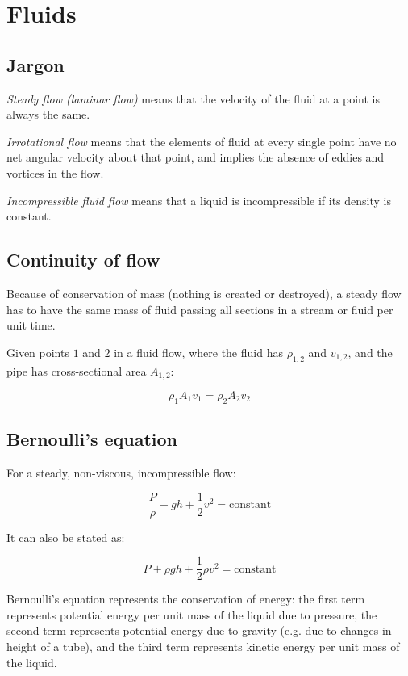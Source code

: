 \documentclass[12pt]{article}
\begin{document}
\newpage

\section{Fluids}

\subsection{Jargon}

\emph{Steady flow (laminar flow)} means that the velocity of the fluid at a point is always the same.

\emph{Irrotational flow} means that the elements of fluid at every single point have no net angular velocity about that point, and implies the absence of eddies and vortices in the flow.

\emph{Incompressible fluid flow} means that a liquid is incompressible if its density is constant.

\subsection{Continuity of flow}

Because of conservation of mass (nothing is created or destroyed), a steady flow has to have the same mass of fluid passing all sections in a stream or fluid per unit time.

Given points $1$ and $2$ in a fluid flow, where the fluid has $\rho_{1,2}$ and $v_{1,2}$, and the pipe has cross-sectional area $A_{1,2}$:

\[
\boxed{
\rho_1 A_1 v_1 = \rho_2 A_2 v_2
}
\]

\subsection{Bernoulli's equation}

For a steady, non-viscous, incompressible flow:

\[
\boxed{
\frac{P}{\rho} + gh + \frac{1}{2}v^2 = \text{constant}
}
\]

It can also be stated as:

\[
\boxed{
P + \rho g h + \frac{1}{2}\rho v^2 = \text{constant}
}
\]

Bernoulli's equation represents the conservation of energy: the first term represents potential energy per unit mass of the liquid due to pressure, the second term represents potential energy due to gravity (e.g. due to changes in height of a tube), and the third term represents kinetic energy per unit mass of the liquid.
\end{document}
